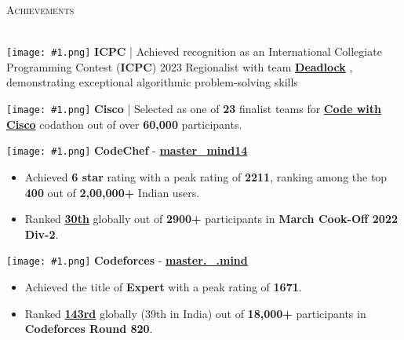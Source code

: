 \documentclass[a4paper]{article}
\newcommand{\tinyBulletSep} { \vspace{2mm} }
\newcommand{\bulletSep} { \vspace{2.5mm} }
\newcommand{\sectionSep} { \vspace{3mm} }
\newcommand{\lineunder} {
    \vspace*{-8pt} \\
    \hspace*{-15pt} \hrulefill \\
}
\newcommand{\header} [1] {
    {\hspace*{-18pt}\vspace*{6pt} {
        \fontfamily{qcs}\selectfont \large \scshape #1
    }}
    \vspace*{-6pt} \lineunder
    \vspace{1.1mm}
}
\newcommand{\linkFont}[1]{
    \textbf{#1}
}
\newcommand{\link}[2]{
    \href{#1}{\textbf{#2}}
}
\newcommand{\projectItem}[5]{
    {\textbf{#1}} {(\sl #2)}\hfill
    \ifx&#3&%
    \link{#4}{Github}\\
    \else
    \linkFont{\href{#3}{Live Preview}~|~\href{#4}{Github}}\\
    \fi
    \vspace{2pt}
    \begin{itemize}
        #5
    \end{itemize}
}
\newcommand{\image}[1]{
    \begingroup
    \normalfont
    \Large
    \texttt{[image: \#1.png]}%
    \endgroup
}
\begin{document}

\sectionSep


\header{Achievements}

\image{icpc} \textbf{ICPC} | Achieved recognition as an International Collegiate Programming Contest (\textbf{ICPC}) 2023 Regionalist with team \textbf{\link{https://icpc.global/ICPCID/6IIRHHSFPAXF}{Deadlock}}, demonstrating exceptional algorithmic problem-solving skills
\tinyBulletSep

\image{cisco} \textbf{Cisco} | Selected as one of \textbf{23} finalist teams for\textbf{\link{https://drive.google.com/file/d/1eBcJ4Ax0QHJq6Kb9MObrU1M9dQ7qvvbI/view?usp=sharing}{Code with Cisco}}codathon out of over \textbf{60,000} participants.
\tinyBulletSep

\image{cc} \textbf{CodeChef} -\textbf{\link{https://www.codechef.com/users/master_mind14}{master\_mind14}}
\begin{itemize}
    \item Achieved \textbf{6 star} rating with a peak rating of \textbf{2211}, ranking among the top \textbf{400} out of \textbf{2,00,000+} Indian users.
    \item Ranked\textbf{\link{https://www.codechef.com/rankings/COOK139B?itemsPerPage=100&order=asc&page=1&search=master_mind14&sortBy=rank}{30th}}globally out of \textbf{2900+} participants in \textbf{March Cook-Off 2022 Div-2}.
\end{itemize}
\tinyBulletSep

\image{cf} \textbf{Codeforces} -\textbf{\link{https://codeforces.com/profile/master._.mind}{master.\_.mind}}
\begin{itemize}
    \item Achieved the title of \textbf{Expert} with a peak rating of \textbf{1671}.
    \item Ranked\textbf{\link{https://codeforces.com/contest/1729/standings/participant/140098304\#p140098304}{143rd}}globally (39th in India) out of \textbf{18,000+} participants in \textbf{Codeforces Round 820}.
\end{itemize}
\tinyBulletSep
\end{document}
